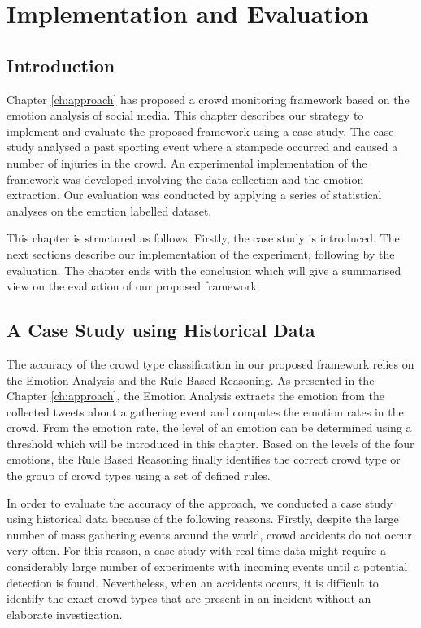 \chapter{Implementation and Evaluation}
\label{ch:eval}
\ifpdf
    \graphicspath{{Chapter5/Figs/Raster/}{Chapter5/Figs/PDF/}{Chapter5/Figs/}}
\else
    \graphicspath{{Chapter5/Figs/Vector/}{Chapter5/Figs/}}
\fi

\section{Introduction}
Chapter \ref{ch:approach} has proposed a crowd monitoring framework based on the emotion analysis of social media. This chapter describes our strategy to implement and evaluate the proposed framework using a case study. The case study analysed a past sporting event where a stampede occurred and caused a number of injuries in the crowd. An experimental implementation of the framework was developed involving the data collection and the emotion extraction. Our evaluation was conducted by applying a series of statistical analyses on the emotion labelled dataset.

This chapter is structured as follows. Firstly, the case study is introduced. The next sections describe our implementation of the experiment, following by the evaluation. The chapter ends with the conclusion which will give a summarised view on the evaluation of our proposed framework.

\section{A Case Study using Historical Data}

The accuracy of the crowd type classification in our proposed framework relies on the Emotion Analysis and the Rule Based Reasoning. As presented in the Chapter \ref{ch:approach}, the Emotion Analysis extracts the emotion from the collected tweets about a gathering event and computes the emotion rates in the crowd. From the emotion rate, the level of an emotion can be determined using a threshold which will be introduced in this chapter. Based on the levels of the four emotions, the Rule Based Reasoning finally identifies the correct crowd type or the group of crowd types using a set of defined rules.

In order to evaluate the accuracy of the approach, we conducted a case study using historical data because of the following reasons. Firstly, despite the large number of mass gathering events around the world, crowd accidents do not occur very often. For this reason, a case study with real-time data might require a considerably large number of experiments with incoming events until a potential detection is found. Nevertheless, when an accidents occurs, it is difficult to identify the exact crowd types that are present in an incident without an elaborate investigation.

